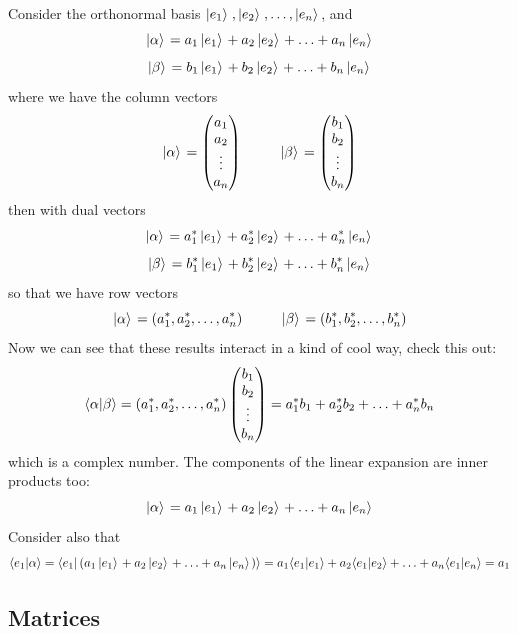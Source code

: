 \documentclass[english, 11pt]{article}
\begin{document}
        Consider the orthonormal basis $\ebasis$, and
        \[ \ka = a_1 \ket{e_1} + a_2 \ket{e_2} + \ldots + a_n \ket{e_n} \]
        \[ \kb = b_1 \ket{e_1} + b_2 \ket{e_2} + \ldots + b_n \ket{e_n} \]
        where we have the column vectors
        \[ \ka = \mtx{a_1 \\ a_2 \\ \vdots \\ a_n} \ \ \ \ \ \ \ \ \kb = \mtx{b_1 \\ b_2 \\ \vdots \\ b_n} \]
        then with dual vectors
        \[ \ka  = a_1^*\ket{e_1} + a_2^*\ket{e_2} + \ldots + a_n^*\ket{e_n} \]
        \[ \kb  = b_1^*\ket{e_1} + b_2^*\ket{e_2} + \ldots + b_n^*\ket{e_n} \]
        so that we have row vectors
        \[ \ka = (a_1^*, a_2^*, \ldots, a_n^*)  \ \ \ \ \ \ \ \ \kb = (b_1^*, b_2^*, \ldots,b_n^*) \]
        Now we can see that these results interact in a kind of cool way, check this out:
        \[ \braket{\alpha}{\beta} = (a_1^*, a_2^*, \ldots, a_n^*) \mtx{b_1 \\ b_2 \\ \vdots \\ b_n} = a_1^*b_1 + a_2^*b_2 + \ldots + a_n^* b_n \]
        which is a complex number. The components of the linear expansion are inner products too:
        \[ \ka = a_1\ket{e_1} + a_2\ket{e_2} + \ldots + a_n\ket{e_n} \]
        Consider also that
        \[ \braket{e_1}{\alpha} = \braket{e_1}{\left(a_1\ket{e_1} + a_2\ket{e_2} + \ldots + a_n\ket{e_n}\right)} = a_1\braket{e_1}{e_1} + a_2\braket{e_1}{e_2} + \ldots + a_n\braket{e_1}{e_n} = a_1\]

     \subsection{Matrices}
\end{document}

